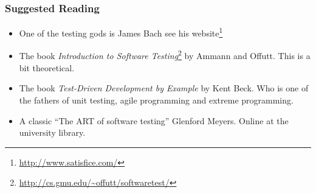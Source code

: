 \documentclass{beamer}
\begin{document}
%
\begin{frame}
  \frametitle{Suggested Reading}
  \begin{itemize}
  \item One of the testing gods is James Bach see his
    website\footnote{\url{http://www.satisfice.com/}}
  \item The book {\em Introduction to Software
      Testing}\footnote{\url{http://cs.gmu.edu/~offutt/softwaretest/}}
    by Ammann and Offutt. This is a bit theoretical. 
  \item The book {\em Test-Driven Development by Example} by Kent Beck.
    Who is one of the  fathers of unit testing, agile programming  and
    extreme programming. 
    \item A classic ``The ART of software testing'' Glenford Meyers.  Online
      at the university library. 
  \end{itemize}
\end{frame}
\end{document}
